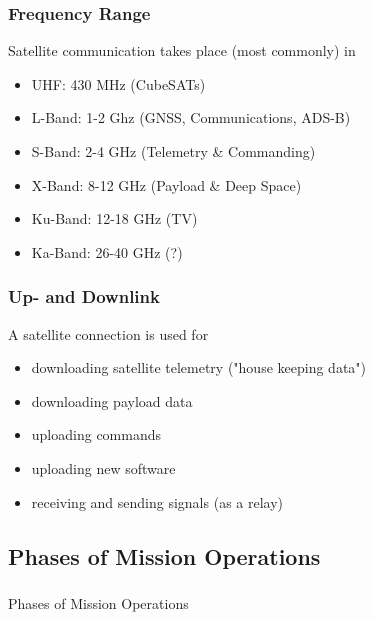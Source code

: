 \documentclass[12pt,utf8,notheorems,compress]{beamer}
\begin{document}
\begin{frame}
  \frametitle{Frequency Range}
  Satellite communication takes place (most commonly) in
  \begin{itemize}
  \item UHF: 430 MHz (CubeSATs) \pause
  \item L-Band: 1-2 Ghz (GNSS, Communications, ADS-B) \pause
  \item S-Band: 2-4 GHz (Telemetry \& Commanding) \pause
  \item X-Band: 8-12 GHz (Payload \& Deep Space) \pause
  \item Ku-Band: 12-18 GHz (TV) \pause
  \item Ka-Band: 26-40 GHz (?)
  \end{itemize}
\end{frame}

\begin{frame}
  \frametitle{Up- and Downlink}
  \pause
  A satellite connection is used for
  \begin{itemize}
  \item downloading satellite telemetry ("house keeping data") \pause
  \item downloading payload data \pause
  \item uploading commands \pause
  \item uploading new software \pause
  \item receiving and sending signals (as a relay)
  \end{itemize}
\end{frame}

\subsection{Phases of Mission Operations}

\begin{frame}
  \frametitle{}
  \vfill
  \begin{center}
    \Large Phases of Mission Operations
  \end{center}
  \vfill
\end{frame}
\end{document}
